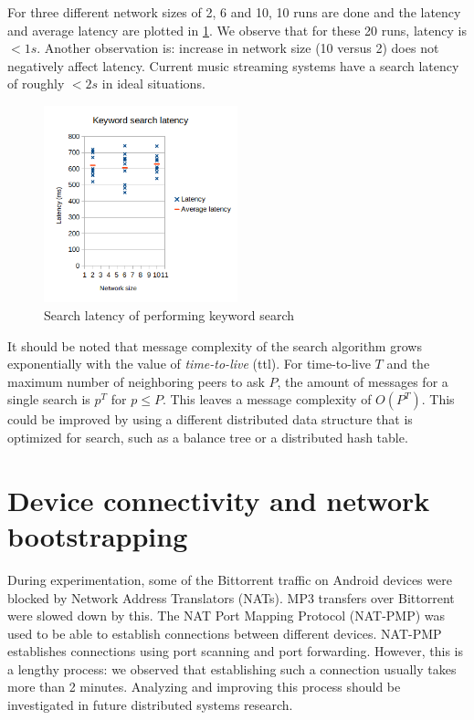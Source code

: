 For three different network sizes of 2, 6 and 10, 10 runs are done and the latency and average latency are plotted in \ref{fig:search-latency}. We observe that for these 20 runs, latency is $<1s$. Another observation is: increase in network size (10 versus 2) does not negatively affect latency. Current music streaming systems have a search latency of roughly $<2s$ in ideal situations.

\begin{figure}
    \centering
    \includegraphics[width=0.5\textwidth]{evaluation/search-latency.png}
    \caption{Search latency of performing keyword search}
    \label{fig:search-latency}
\end{figure}

It should be noted that message complexity of the search algorithm grows exponentially with the value of \textit{time-to-live} (ttl). For time-to-live $T$ and the maximum number of neighboring peers to ask $P$, the amount of messages for a single search is $p^T$ for $p\leq P$. This leaves a message complexity of $O(P^T)$. This could be improved by using a different distributed data structure that is optimized for search, such as a balance tree or a distributed hash table. 

\section{Device connectivity and network bootstrapping}
During experimentation, some of the Bittorrent traffic on Android devices were blocked by Network Address  Translators (NATs). MP3 transfers over Bittorrent were slowed down by this. The NAT Port Mapping Protocol (NAT-PMP) was used to be able to establish connections between different devices. NAT-PMP establishes connections using port scanning and port forwarding. However, this is a lengthy process: we observed that establishing such a connection usually takes more than 2 minutes. Analyzing and improving this process should be investigated in future distributed systems research.

